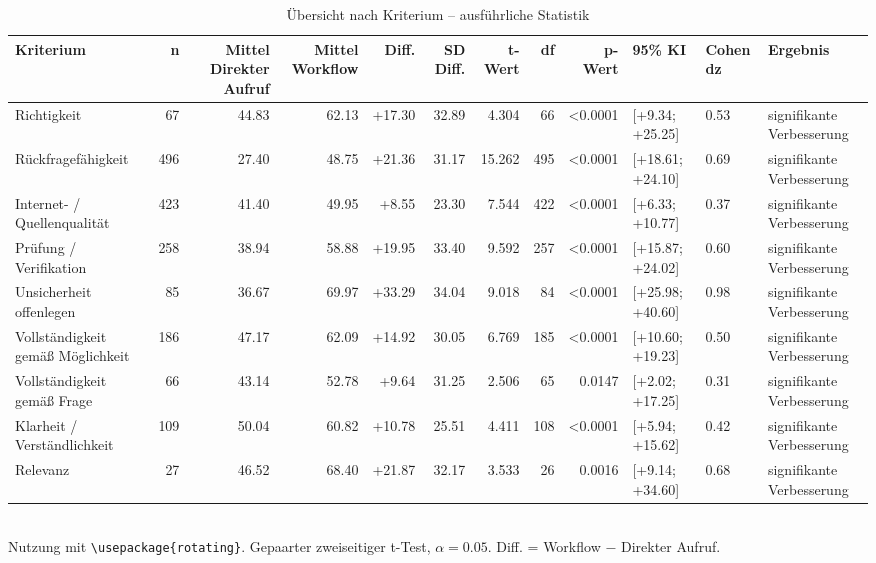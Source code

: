 \begin{table}
\centering
\caption{Übersicht nach Kriterium -- ausführliche Statistik}
\begin{tabular}{lrrrrrrrrlll}
\toprule
Kriterium & n & Mittel Direkter Aufruf & Mittel Workflow & Diff. & SD Diff. & t-Wert & df & p-Wert & 95\% KI & Cohen dz & Ergebnis \\
\midrule
Richtigkeit & 67 & 44.83 & 62.13 & +17.30 & 32.89 & 4.304 & 66 & <0.0001 & [+9.34; +25.25] & 0.53 & signifikante Verbesserung \\
Rückfragefähigkeit & 496 & 27.40 & 48.75 & +21.36 & 31.17 & 15.262 & 495 & <0.0001 & [+18.61; +24.10] & 0.69 & signifikante Verbesserung \\
Internet- / Quellenqualität & 423 & 41.40 & 49.95 & +8.55 & 23.30 & 7.544 & 422 & <0.0001 & [+6.33; +10.77] & 0.37 & signifikante Verbesserung \\
Prüfung / Verifikation & 258 & 38.94 & 58.88 & +19.95 & 33.40 & 9.592 & 257 & <0.0001 & [+15.87; +24.02] & 0.60 & signifikante Verbesserung \\
Unsicherheit offenlegen & 85 & 36.67 & 69.97 & +33.29 & 34.04 & 9.018 & 84 & <0.0001 & [+25.98; +40.60] & 0.98 & signifikante Verbesserung \\
Vollständigkeit gemäß Möglichkeit & 186 & 47.17 & 62.09 & +14.92 & 30.05 & 6.769 & 185 & <0.0001 & [+10.60; +19.23] & 0.50 & signifikante Verbesserung \\
Vollständigkeit gemäß Frage & 66 & 43.14 & 52.78 & +9.64 & 31.25 & 2.506 & 65 & 0.0147 & [+2.02; +17.25] & 0.31 & signifikante Verbesserung \\
Klarheit / Verständlichkeit & 109 & 50.04 & 60.82 & +10.78 & 25.51 & 4.411 & 108 & <0.0001 & [+5.94; +15.62] & 0.42 & signifikante Verbesserung \\
Relevanz & 27 & 46.52 & 68.40 & +21.87 & 32.17 & 3.533 & 26 & 0.0016 & [+9.14; +34.60] & 0.68 & signifikante Verbesserung \\
\bottomrule
\end{tabular}
\\[2mm]
\footnotesize Nutzung mit \texttt{\textbackslash usepackage\{rotating\}}. Gepaarter zweiseitiger t-Test, $\alpha=0.05$. Diff. = Workflow $-$ Direkter Aufruf.
\end{table}
